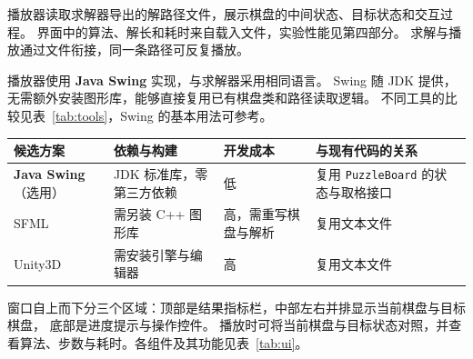 播放器读取求解器导出的解路径文件，展示棋盘的中间状态、目标状态和交互过程。
界面中的算法、解长和耗时来自载入文件，实验性能见第四部分。
求解与播放通过文件衔接，同一条路径可反复播放。

\par\vspace{2bp}

播放器使用 \textbf{Java Swing} 实现，与求解器采用相同语言。
Swing 随 JDK 提供，无需额外安装图形库，能够直接复用已有棋盘类和路径读取逻辑。
不同工具的比较见表~\ref{tab:tools}，Swing 的基本用法可参考\cite{swing-bilibili}。

\noindent\begin{minipage}{\linewidth}
\label{tab:tools}
\begin{center}
{\fontsize{9bp}{12bp}\selectfont
\begin{tabular}{p{58bp}p{92bp}p{68bp}p{96bp}}
\toprule
\textbf{候选方案} & \textbf{依赖与构建} & \textbf{开发成本} & \textbf{与现有代码的关系} \\
\midrule
\textbf{Java Swing}（选用） & JDK 标准库，零第三方依赖 & 低 & 复用 \texttt{PuzzleBoard} 的状态与取格接口 \\
SFML & 需另装 C++ 图形库 & 高，需重写棋盘与解析 & 复用文本文件 \\
Unity3D & 需安装引擎与编辑器 & 高 & 复用文本文件 \\
\bottomrule
\end{tabular}}
\end{center}
\end{minipage}\par

\par\vspace{2bp}

\par\vspace{2bp}

窗口自上而下分三个区域：顶部是结果指标栏，中部左右并排显示当前棋盘与目标棋盘，
底部是进度提示与操作控件。
播放时可将当前棋盘与目标状态对照，并查看算法、步数与耗时。各组件及其功能见表~\ref{tab:ui}。

